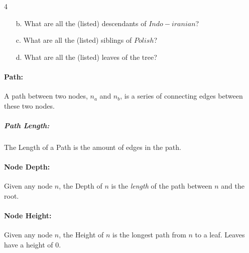 \documentclass[a4paper,12pt,oneside]{book}
\newcounter{question}
\begin{document}
\begin{question}{\thequestion}{4}
\begin{itemize}
                \item[b.]   What are all the (listed) descendants of $Indo-iranian$?
                
                \item[c.]   What are all the (listed) siblings of $Polish$?
                
                \item[d.]   What are all the (listed) leaves of the tree?
            \end{itemize}
            
        \end{question}

    \newpage

        \paragraph{Path:} A path between two nodes, $n_{a}$ and $n_{b}$,
            is a series of connecting edges between these two nodes.

            \subparagraph{Path Length:} The Length of a Path is the
                amount of edges in the path.

        \paragraph{Node Depth:} Given any node $n$, the Depth of $n$ is
            the \textit{length} of the path between $n$ and the root.
        
        \paragraph{Node Height:} Given any node $n$, the Height of $n$ is
            the longest path from $n$ to a leaf. Leaves have a height of 0.

        \hrulefill
        
\end{document}
